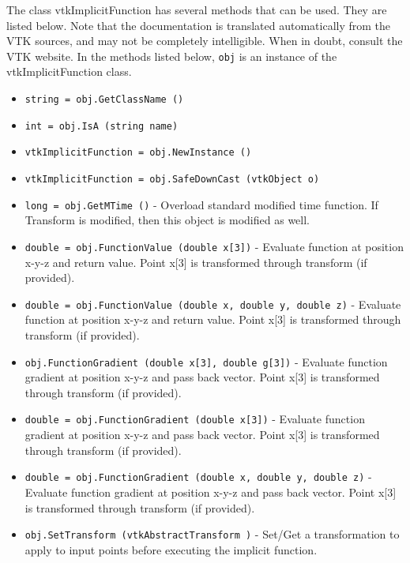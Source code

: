 The class vtkImplicitFunction has several methods that can be used.
  They are listed below.
Note that the documentation is translated automatically from the VTK sources,
and may not be completely intelligible.  When in doubt, consult the VTK website.
In the methods listed below, \verb|obj| is an instance of the vtkImplicitFunction class.
\begin{itemize}
\item  \verb|string = obj.GetClassName ()|

\item  \verb|int = obj.IsA (string name)|

\item  \verb|vtkImplicitFunction = obj.NewInstance ()|

\item  \verb|vtkImplicitFunction = obj.SafeDownCast (vtkObject o)|

\item  \verb|long = obj.GetMTime ()| -  Overload standard modified time function. If Transform is modified,
 then this object is modified as well.

\item  \verb|double = obj.FunctionValue (double x[3])| -  Evaluate function at position x-y-z and return value. Point x[3] is
 transformed through transform (if provided).

\item  \verb|double = obj.FunctionValue (double x, double y, double z)| -  Evaluate function at position x-y-z and return value. Point x[3] is
 transformed through transform (if provided).

\item  \verb|obj.FunctionGradient (double x[3], double g[3])| -  Evaluate function gradient at position x-y-z and pass back vector. Point
 x[3] is transformed through transform (if provided).

\item  \verb|double = obj.FunctionGradient (double x[3])| -  Evaluate function gradient at position x-y-z and pass back vector. Point
 x[3] is transformed through transform (if provided).

\item  \verb|double = obj.FunctionGradient (double x, double y, double z)| -  Evaluate function gradient at position x-y-z and pass back vector. Point
 x[3] is transformed through transform (if provided).

\item  \verb|obj.SetTransform (vtkAbstractTransform )| -  Set/Get a transformation to apply to input points before
 executing the implicit function.


\end{itemize}
